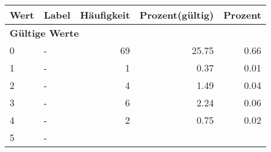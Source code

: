      \begin{longtable}{lXrrr}
     \toprule
     \textbf{Wert} & \textbf{Label} & \textbf{Häufigkeit} & \textbf{Prozent(gültig)} & \textbf{Prozent} \\
     \endhead
     \midrule
     \multicolumn{5}{l}{\textbf{Gültige Werte}}\\

     0 &
     \multicolumn{1}{X}{ -  } &


       \num{69} &
       \num[round-mode=places,round-precision=2]{25.75} &
         \num[round-mode=places,round-precision=2]{0.66} \\

     1 &
     \multicolumn{1}{X}{ -  } &


       \num{1} &
       \num[round-mode=places,round-precision=2]{0.37} &
         \num[round-mode=places,round-precision=2]{0.01} \\

     2 &
     \multicolumn{1}{X}{ -  } &


       \num{4} &
       \num[round-mode=places,round-precision=2]{1.49} &
         \num[round-mode=places,round-precision=2]{0.04} \\

     3 &
     \multicolumn{1}{X}{ -  } &


       \num{6} &
       \num[round-mode=places,round-precision=2]{2.24} &
         \num[round-mode=places,round-precision=2]{0.06} \\

     4 &
     \multicolumn{1}{X}{ -  } &


       \num{2} &
       \num[round-mode=places,round-precision=2]{0.75} &
         \num[round-mode=places,round-precision=2]{0.02} \\

     5 &
     \multicolumn{1}{X}{ -  } &



\end{longtable}
